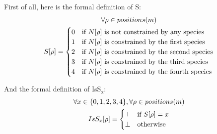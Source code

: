First of all, here is the formal definition of S:
\begin{equation}
    \begin{gathered}
        \forall \rho \in positions(m)\\
        S[\rho] = \begin{cases}
            0 & \text{if } N[\rho] \text{ is not constrained by any species}\\
            1 & \text{if } N[\rho] \text{ is constrained by the first species}\\
            2 & \text{if } N[\rho] \text{ is constrained by the second species}\\
            3 & \text{if } N[\rho] \text{ is constrained by the third species}\\
            4 & \text{if } N[\rho] \text{ is constrained by the fourth species}\\
        \end{cases}\\
    \end{gathered}
\end{equation}

And the formal definition of IsS$_\text{x}$:
\begin{equation}
    \begin{gathered}
        \forall x \in \{0, 1, 2, 3, 4\}, \forall \rho \in positions(m)\\
        IsS_{x}[\rho] = \begin{cases}
            \top & \text{if } S[\rho] = x\\
            \bot & \text{otherwise}
        \end{cases}\\
    \end{gathered}
\end{equation}


